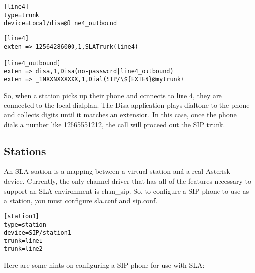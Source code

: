 \documentclass[12pt,a4]{article}
\begin{document}
\begin{verbatim}
[line4]
type=trunk
device=Local/disa@line4_outbound
\end{verbatim}


\begin{verbatim}
[line4]
exten => 12564286000,1,SLATrunk(line4)

[line4_outbound]
exten => disa,1,Disa(no-password|line4_outbound)
exten => _1NXXNXXXXXX,1,Dial(SIP/\${EXTEN}@mytrunk)
\end{verbatim}


So, when a station picks up their phone and connects to line 4, they are
connected to the local dialplan.  The Disa application plays dialtone to the
phone and collects digits until it matches an extension.  In this case, once
the phone dials a number like 12565551212, the call will proceed out the
SIP trunk.

\subsection{Stations}

An SLA station is a mapping between a virtual station and a real Asterisk device.
Currently, the only channel driver that has all of the features necessary to
support an SLA environment is chan\_sip.  So, to configure a SIP phone to use
as a station, you must configure sla.conf and sip.conf.  

\begin{verbatim}
[station1]
type=station
device=SIP/station1
trunk=line1
trunk=line2
\end{verbatim}

Here are some hints on configuring a SIP phone for use with SLA:
\end{document}
